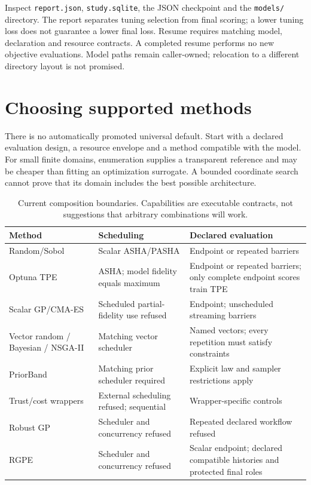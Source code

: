 Inspect \texttt{report.json}, \texttt{study.sqlite}, the JSON checkpoint and
the \texttt{models/} directory. The report separates tuning selection from
final scoring; a lower tuning loss does not guarantee a lower final loss.
Resume requires matching model, declaration and resource contracts. A completed
resume performs no new objective evaluations. Model paths remain
caller-owned; relocation to a different directory layout is not promised.

\section{Choosing supported methods}

There is no automatically promoted universal default. Start with a declared
evaluation design, a resource envelope and a method compatible with the model.
For small finite domains, enumeration supplies a transparent reference and may
be cheaper than fitting an optimization surrogate. A bounded coordinate search
cannot prove that its domain includes the best possible architecture.

\begin{table}[htbp]
\centering\small
\begin{tabularx}{\textwidth}{p{}XX}
\toprule Method & Scheduling & Declared evaluation \\
\midrule
Random/Sobol & Scalar ASHA/PASHA & Endpoint or repeated barriers \\
Optuna TPE & ASHA; model fidelity equals maximum & Endpoint or repeated
barriers; only complete endpoint scores train TPE \\
Scalar GP/CMA-ES & Scheduled partial-fidelity use refused & Endpoint;
unscheduled streaming barriers \\
Vector random / Bayesian / NSGA-II & Matching vector scheduler & Named
vectors; every repetition must satisfy constraints \\
PriorBand & Matching prior scheduler required & Explicit law and sampler
restrictions apply \\
Trust/cost wrappers & External scheduling refused; sequential &
Wrapper-specific controls \\
Robust GP & Scheduler and concurrency refused & Repeated declared workflow
refused \\
RGPE & Scheduler and concurrency refused & Scalar endpoint; declared
compatible histories and protected final roles \\
\bottomrule
\end{tabularx}
\caption{Current composition boundaries. Capabilities are executable
contracts, not suggestions that arbitrary combinations will work.}
\label{tab:current-composition}
\end{table}

